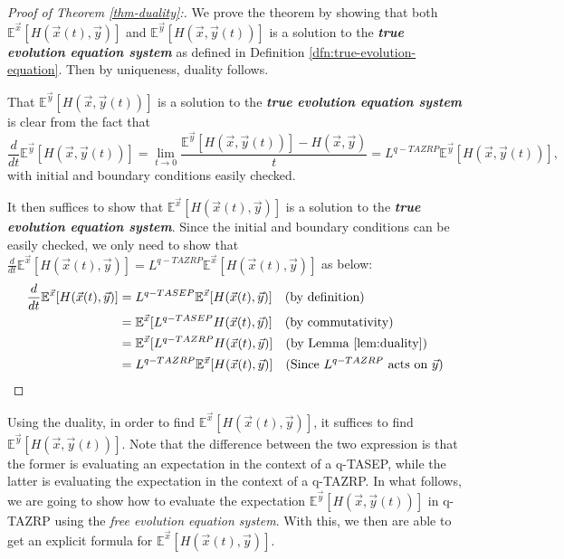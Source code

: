 \begin{proof}[Proof of Theorem \ref{thm-duality}:]
We prove the theorem by showing that both $\mathbb{E}^{\vec{x}}[H(\vec{x}(t),\vec{y})]$ and $\mathbb{E}^{\vec{y}}[H(\vec{x},\vec{y}(t))]$ is a solution to the \textbf{\emph{true evolution equation system}} as defined in Definition \ref{dfn:true-evolution-equation}. Then by uniqueness, duality follows. 

That $\mathbb{E}^{\vec{y}}[H(\vec{x},\vec{y}(t))]$ is a solution to the \textbf{\emph{true evolution equation system}} is clear from the fact that $$\frac{d}{dt}\mathbb{E}^{\vec{y}}[H(\vec{x},\vec{y}(t))] = \lim_{t \rightarrow 0} \frac{\mathbb{E}^{\vec{y}}[H(\vec{x},\vec{y}(t))] - H(\vec{x},\vec{y})}{t} = L^{q-TAZRP} \mathbb{E}^{\vec{y}}[H(\vec{x},\vec{y}(t))],$$ with initial and boundary conditions easily checked. 

It then suffices to show that $\mathbb{E}^{\vec{x}}[H(\vec{x}(t),\vec{y})]$ is a solution to the \textbf{\emph{true evolution equation system}}. Since the initial and boundary conditions can be easily checked, we only need to show that $\frac{d}{dt} \mathbb{E}^{\vec{x}}[H(\vec{x}(t),\vec{y})] = L^{q-TAZRP} \mathbb{E}^{\vec{x}}[H(\vec{x}(t),\vec{y})]$ as below:
\begin{align*}
\frac{d}{dt} \mathbb{E}^{\vec{x}}[H(\vec{x}(t),\vec{y})] &= L^{q-TASEP} \mathbb{E}^{\vec{x}}[H(\vec{x}(t),\vec{y})] \quad (\text{by definition})\\
																												 &= \mathbb{E}^{\vec{x}} [L^{q-TASEP} H(\vec{x}(t),\vec{y})] \quad (\text{by commutativity})\\
																												 &= \mathbb{E}^{\vec{x}} [L^{q-TAZRP} H(\vec{x}(t),\vec{y})] \quad (\text{by Lemma }\ref{lem:duality}) \\
																												 &= L^{q-TAZRP} \mathbb{E}^{\vec{x}} [H(\vec{x}(t),\vec{y})] \quad (\text{Since $L^{q-TAZRP}$ acts on $\vec{y}$})
\end{align*}
\end{proof}
Using the duality, in order to find $\mathbb{E}^{\vec{x}}[H(\vec{x}(t),\vec{y})]$, it suffices to find $\mathbb{E}^{\vec{y}}[H(\vec{x},\vec{y}(t))]$. Note that the difference between the two expression is that the former is evaluating an expectation in the context of a q-TASEP, while the latter is evaluating the expectation in the context of a q-TAZRP. In what follows, we are going to show how to evaluate the expectation $\mathbb{E}^{\vec{y}}[H(\vec{x},\vec{y}(t))]$ in q-TAZRP using the \emph{free evolution equation system}. With this, we then are able to get an explicit formula for $\mathbb{E}^{\vec{x}}[H(\vec{x}(t),\vec{y})]$.
